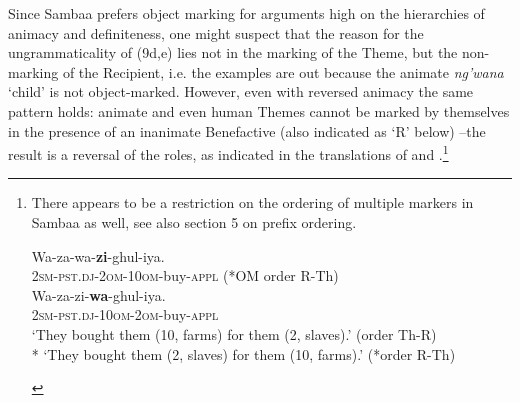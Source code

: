\documentclass[output=paper
,modfonts
,nonflat]{langsci/langscibook}
\begin{document}
Since Sambaa prefers object marking for arguments high on the hierarchies of animacy and definiteness, one might suspect that the reason for the ungrammaticality of (9d,e) lies not in the marking of the Theme, but the non-marking of the Recipient, i.e. the examples are out because the animate \textit{ng’wana} ‘child’ is not object-marked. However, even with reversed animacy the same pattern holds: animate and even human Themes cannot be marked by themselves in the presence of an inanimate Benefactive (also indicated as ‘R’ below) –the result is a reversal of the roles, as indicated in the translations of  and .\footnote{There appears to be a restriction on the ordering of multiple markers in Sambaa as well, see also section 5 on prefix ordering.
\begin{exe}
\ex 
	\xlist
	\ex 
		\gll *Wa-za-wa-\textbf{zi}-ghul-iya.\\
		\textsc{2sm-pst.dj-2om-10om}-buy-\textsc{appl}\hspace{3.5cm} (*OM order R-Th)	\\
	\ex 
		\gll Wa-za-zi{}-\textbf{wa}-ghul-iya.\\
		\textsc{2sm-pst.dj-10om-2om}-buy-\textsc{appl}\\
		\glt `They bought them (10, farms) for them (2, slaves).'\hspace{1.1cm} (order Th-R)\\
		* `They bought them (2, slaves) for them (10, farms).'\hspace{0.9cm} (*order R-Th)
	\endxlist
\end{exe}} %
\end{document}
